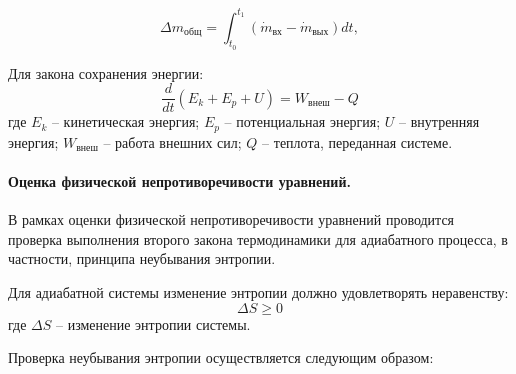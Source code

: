 \begin{equation*}
    \Delta m_\text{общ} = \int_{t_0}^{t_1} (\dot{m}_\text{вх} - \dot{m}_\text{вых}) dt,
\end{equation*}

Для закона сохранения энергии:
\begin{equation*}
    \frac{d}{dt}(E_k + E_p + U) = W_{\text{внеш}} - Q
\end{equation*}
где $E_k$ -- кинетическая энергия;
$E_p$ -- потенциальная энергия;
$U$ -- внутренняя энергия;
$W_{\text{внеш}}$ -- работа внешних сил;
$Q$ -- теплота, переданная системе.

\paragraph{Оценка физической непротиворечивости уравнений.}

В рамках оценки физической непротиворечивости уравнений проводится проверка
выполнения второго закона термодинамики для адиабатного процесса, в частности, принципа неубывания энтропии.

Для адиабатной системы изменение энтропии должно удовлетворять неравенству:
\begin{equation*}
    \Delta S \geq 0
\end{equation*}
где $\Delta S$ -- изменение энтропии системы.

Проверка неубывания энтропии осуществляется следующим образом:

